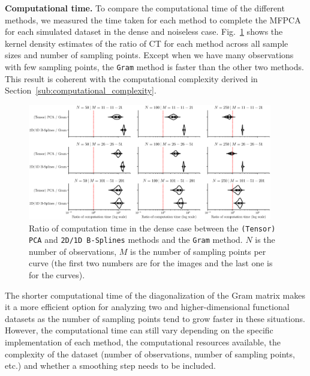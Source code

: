 \documentclass[times,sort&compress,3p]{elsarticle}
\theoremstyle{plain}%
\theoremstyle{definition}
\newenvironment{results}[1][]{\noindent \textbf{#1} \rmfamily}{\medskip}
\begin{document}
\begin{results}[Computational time.]
To compare the computational time of the different methods, we measured the time taken for each method to complete the MFPCA for each simulated dataset in the dense and noiseless case. Fig.~\ref{fig:computation_time_mfd_1d} shows the kernel density estimates of the ratio of CT for each method across all sample sizes and number of sampling points. Except when we have many observations with few sampling points, the \texttt{Gram} method is faster than the other two methods. This result is coherent with the computational complexity derived in Section~\ref{sub:computational_complexity}.

\begin{figure}
     \centering
    \includegraphics[width=0.95\textwidth]{computation_time}
    \caption{Ratio of computation time in the dense case between the \texttt{(Tensor) PCA} and \texttt{2D/1D B-Splines} methods and the \texttt{Gram} method. $N$ is the number of observations, $M$ is the number of sampling points per curve (the first two numbers are for the images and the last one is for the curves).}
    \label{fig:computation_time_mfd_1d}
\end{figure}

The shorter computational time of the diagonalization of the Gram matrix makes it a more efficient option for analyzing two and higher-dimensional functional datasets as the number of sampling points tend to grow faster in these situations. However, the computational time can still vary depending on the specific implementation of each method, the computational resources available, the complexity of the dataset (number of observations, number of sampling points, etc.) and whether a smoothing step needs to be included.
\end{results}
\end{document}
